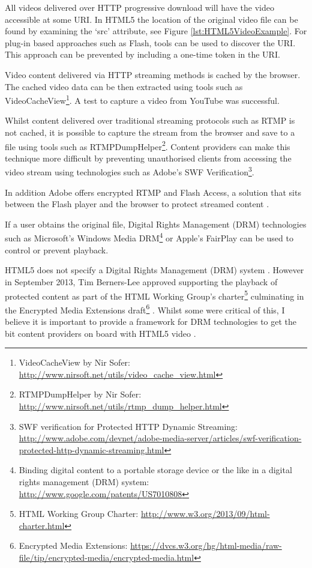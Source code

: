 \documentclass[journal]{IEEEtran}
\begin{document}
All videos delivered over HTTP progressive download will have the video accessible at some URI. In HTML5 the location of the original video file can be found by examining the `src' attribute, see Figure \ref{lst:HTML5VideoExample}. For plug-in based approaches such as Flash, tools can be used to discover the URI. %
This approach can be prevented by including a one-time token in the URI.

Video content delivered via HTTP streaming methods is cached by the browser. The cached video data can be then extracted using tools such as VideoCacheView\footnote{VideoCacheView by Nir Sofer: \url{http://www.nirsoft.net/utils/video_cache_view.html}}. A test to capture a video from YouTube was successful.

Whilst content delivered over traditional streaming protocols such as RTMP is not cached, it is possible to capture the stream from the browser and save to a file using tools such as RTMPDumpHelper\footnote{RTMPDumpHelper by Nir Sofer: \url{http://www.nirsoft.net/utils/rtmp_dump_helper.html}}. Content providers can make this technique more difficult by preventing unauthorised clients from accessing the video stream using technologies such as Adobe's SWF Verification\footnote{SWF verification for Protected HTTP Dynamic Streaming: \url{http://www.adobe.com/devnet/adobe-media-server/articles/swf-verification-protected-http-dynamic-streaming.html}}. 

In addition Adobe offers encrypted RTMP and Flash Access, a solution that sits between the Flash player and the browser to protect streamed content \cite{whitePaper:flashAccess}.

If a user obtains the original file, Digital Rights Management (DRM) technologies such as Microsoft's Windows Media DRM\footnote{Binding digital content to a portable storage device or the like in a digital rights management (DRM) system: \url{http://www.google.com/patents/US7010808}} or Apple's FairPlay can be used to control or prevent playback.

HTML5 does not specify a Digital Rights Management (DRM) system \cite{article:HTML5LeadsAWebRevolution}. However in September 2013, Tim Berners-Lee approved supporting the playback of protected content as part of the HTML Working Group's charter\footnote{HTML Working Group Charter: \url{http://www.w3.org/2013/09/html-charter.html}} culminating in the Encrypted Media Extensions draft\footnote{Encrypted Media Extensions: \url{https://dvcs.w3.org/hg/html-media/raw-file/tip/encrypted-media/encrypted-media.html}} \cite{email:newHTMLCharter}.
Whilst some were critical of this, I believe it is important to provide a framework for DRM technologies to get the bit content providers on board with HTML5 video \cite{website:EEFDRM}. 
\end{document}
